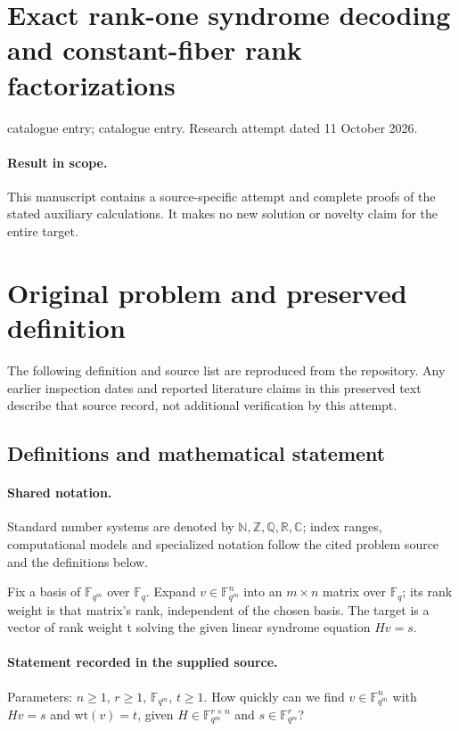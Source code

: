 \documentclass[11pt]{article}
\begin{document}
\section*{Exact rank-one syndrome decoding and constant-fiber rank factorizations}
\noindent catalogue entry; catalogue entry. Research attempt dated 11 October 2026.
\paragraph{Result in scope.}This manuscript contains a source-specific attempt and complete proofs of the stated auxiliary calculations. It makes no new solution or novelty claim for the entire target.
\section{Original problem and preserved definition}
The following definition and source list are reproduced from the repository. Any earlier inspection dates and reported literature claims in this preserved text describe that source record, not additional verification by this attempt.
\subsection{Definitions and mathematical statement}

\paragraph{Shared notation.}Standard number systems are denoted by $\mathbb N,\mathbb Z,\mathbb Q,\mathbb R,\mathbb C$; index ranges, computational models and specialized notation follow the cited problem source and the definitions below.


Fix a basis of $\mathbb F_{q^m}$ over $\mathbb F_q$. Expand $v\in\mathbb F_{q^m}^n$ into an $m\times n$ matrix over $\mathbb F_q$; its rank weight is that matrix's rank, independent of the chosen basis. The target is a vector of rank weight t solving the given linear syndrome equation $Hv=s$.
\paragraph{Statement recorded in the supplied source.}
Parameters: $n \geq 1$, $r\geq 1$, $\mathbb F_{q^m}$, $t \geq 1$. How quickly can we find $v\in \mathbb F_{q^m}^n$ with $Hv = s$ and $\text{wt}(v) = t$, given $H\in \mathbb F_{q^m}^{r\times n}$ and $s\in \mathbb F_{q^m}^r$?
\end{document}
